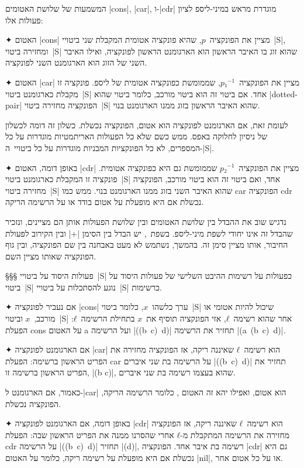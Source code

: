 המשמעות של שלושת האטומים \T|cons|, \T|car|, ו-\T|cdr| מוגדרת מראש במיני-ליספ
לציון פעולות אלו:

\begin{enumerate}
  ✦ האטום \T|cons| מציין את הפונקציה~$p$, שהיא פונקציה אטומית המקבלת שני
  ביטויי~\E|S|, ומחזירה ביטוי~\E|S| שהוא זוג בו האיבר הראשון הוא הארגומנט
  הראשון לפונקציה, ואילו האיבר השני של הזוג הוא הארגומנט השני לפונקציה.

  ✦ האטום \T|car| מציין את הפונקציה~$p₁^{-1}$, שממומשת כפונקציה אטומית של
  ליספ. פונקציה זו מקבלת כארגומנט ביטוי~\E|S| אחד. אם ביטוי זה הוא ביטוי מורכב,
  כלומר ביטוי שהוא \E|dotted-pair| הפונקציה מחזירה ביטוי~\E|S| שהוא האיבר
  הראשון בזוג ממנו הארגומנט בנוי.

  לעומת זאת, אם הארגומנט לפונקציה הוא אטום, הפונקציה נכשלת. כשלון זה דומה
  לכשלון של ניסיון לחלוקה באפס. ממש כשם שלא כל הפעולות האריתמטיות מוגדרות על כל
  המספרים, לא כל הפונקציות המבניות מוגדרות על כל ביטויי~ה-\E|S|.

  ✦ באופן דומה, האטום \T|cdr| מציין את הפונקציה~$p₂^{-1}$ שממומשת גם היא
  כפונקציה אטומית. פונקציה זו המקבלת כארגומנט ביטוי~\E|S| אחד, ואם ביטוי זה
  הוא ביטוי מורכב, הפונקציה מחזירה ביטוי~\E|S| שהוא האיבר השני בזוג ממנו
  הארגומנט בנוי. ממש כמו car הפונקציה cdr נכשלת אם היא מופעלת על אטום בודד
  או על הרשימה הריקה.
\end{enumerate}

נדגיש שוב את ההבדל בין שלושת האטומים ובין שלושת הפעולות אותן הם מציינים, ונזכיר
שהבדל זה אינו יחודי לשפת מיני-ליספ. בשפת~\CPL, יש הבדל בין הסימן \T|+| ובין
הקירוב לפעולת החיבור, אותו מציין סימן זה. בהמשך, נשתמש לא מעט באבחנה בין שם
הפונקציה, ובין גוף הפונקציה שאותו מציין השם.

§§§ פעולות היסוד על ביטויי~\E|S| כפעולות על רשימות
ההיבט השלישי של פעולות היסוד על ביטוי~\E|S| נוגע להסתכלות על ביטויי~\E|S|
כרשימות.

\begin{enumerate}
  ✦ אם נעביר לפונקציה \T|cons| ערך כלשהו~$x$, כלומר ביטוי~\E|S| שיכול להיות
  אטומי או מורכב,~$x$ וביטוי~\E|S| אחר שהוא רשימה~$ℓ$, אזי הפונקציה תוסיף את~$x$
  בתחילת הרשימה~$ℓ$: הפעלת cons על האטום a ועל הרשימה \E|((b~c)~d)| תחזיר את
  הרשימה \E|(a~(b~c)~d)|.

  ✦ אם הארגומנט לפונקציה \T|car| הוא רשימה~$ℓ$ שאיננה ריקה, אז הפונקציה מחזירה
  את הפריט הראשון ברשימה: הפעלת car על הרשימה בת שני איברים \E|((b~c)~d)| תחזיר
  את הפריט הראשון ברשימה זו, \E|(b c)|, שהוא בעצמו רשימה בת שני איברים.

  כאמור, אם הארגומנט ל-\E|car| הוא אטום, ואפילו יהא זה האטום ,
  כלומר הרשימה הריקה, הפונקציה נכשלת.

  ✦ באופן דומה, אם הארגומנט לפונקציה \T|cdr| הוא רשימה~$ℓ$ שאיננה ריקה, אז
  הפונקציה מחזירה את הרשימה המתקבלת מ-$ℓ$ אחרי שהסרנו ממנה את הפריט הראשון שבה:
  הפעלת cdr על הרשימה \E|((b~c)~d)| תחזיר \E|(d)|, רשימה בת איבר אחד. הפונקציה
  \E|cdr| גם היא נכשלת אם היא מופעלת על רשימה ריקה, כלומר על האטום \E|nil|, או
  על כל אטום אחר.
\end{enumerate}

